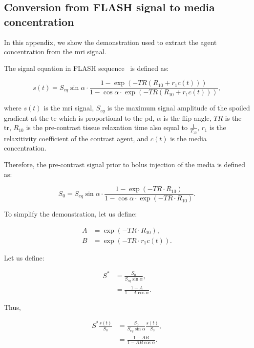 \begin{appendices}
\chapter{Conversion from FLASH signal to media concentration}\label{app:signaltoconc}

In this appendix, we show the demonstration used to extract the agent concentration from the \ac{mri} signal.

The signal equation in FLASH sequence~\cite{haase1986flash} is defined as:

\begin{equation}
  s(t) = S_{eq} \sin \alpha \cdot \frac{1 - \exp\left(-TR\left(R_{10} + r_1 c(t)\right)\right)}{1 - \cos \alpha \cdot \exp\left(-TR\left(R_{10} + r_1 c(t)\right)\right)} ,
  \label{eq:app:flash}
\end{equation}

\noindent where $s(t)$ is the \ac{mri} signal, $S_{eq}$ is the maximum signal amplitude of the spoiled gradient at the \ac{te} which is proportional to the \ac{pd}, $\alpha$ is the flip angle, $TR$ is the \acf{tr}, $R_{10}$ is the pre-contrast tissue relaxation time also equal to $\frac{1}{T_{10}}$, $r_1$ is the relaxitivity coefficient of the contrast agent, and $c(t)$ is the media concentration.

Therefore, the pre-contrast signal prior to bolus injection of the media is defined as:

\begin{equation}
  S_0 = S_{eq} \sin \alpha \cdot \frac{1 - \exp\left(-TR \cdot R_{10}\right)}{1 - \cos \alpha \cdot \exp\left(-TR \cdot R_{10}\right)} .
  \label{eq:app:precontrast}
\end{equation}

To simplify the demonstration, let us define:

\begin{align}
  A &= \exp(-TR \cdot R_{10}) , \\
  B &= \exp(-TR \cdot r_1 c(t)) .
\end{align}

Let us define:

\begin{align}
  S^{*} &= \frac{S_0}{S_{eq} \sin \alpha} , \\
  &= \frac{1 - A}{1 - A \cos \alpha} .
\end{align}

Thus,

\begin{align}
  S^{*}\frac{s(t)}{S_0} &= \frac{S_0}{S_{eq}\sin \alpha} \frac{s(t)}{S_0} , \\
  &= \frac{1 - A B}{1 - A B \cos \alpha} .
\end{align}


\end{appendices}

